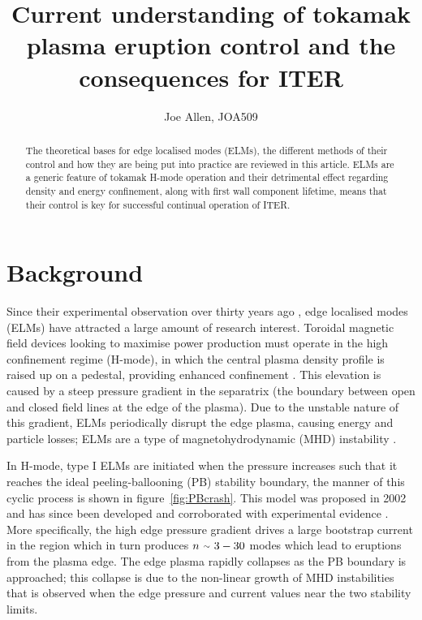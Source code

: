 \documentclass[11pt, twocolumn]{article}  %
\providecommand{\squiggle}{\raise.17ex\hbox{$\scriptstyle\sim$}} %
\begin{document}
\title{Current understanding of tokamak plasma eruption control and the consequences for ITER}
\author{Joe Allen, JOA509}
\maketitle

\begin{abstract}
The theoretical bases for edge localised modes (ELMs), the different methods of their control and how they are being put into practice are reviewed in this article. ELMs are a generic feature of tokamak H-mode operation and their detrimental effect regarding density and energy confinement, along with first wall component lifetime, means that their control is key for successful continual operation of ITER. 
\end{abstract}

\tableofcontents

\section{Background}\label{sec:Bg}
Since their experimental observation over thirty years ago \cite{Keilhacker1984}, edge localised modes (ELMs) have attracted a large amount of research interest. Toroidal magnetic field devices looking to maximise power production must operate in the high confinement regime (H-mode), in which the central plasma density profile is raised up on a pedestal, providing enhanced confinement \cite{Wagner2007}. This elevation is caused by a steep pressure gradient in the separatrix (the boundary between open and closed field lines at the edge of the plasma). Due to the unstable nature of this gradient, ELMs periodically disrupt the edge plasma, causing energy and particle losses; ELMs are a type of magnetohydrodynamic (MHD) instability \cite{Zohm1996}.

In H-mode, type I ELMs are initiated when the pressure increases such that it reaches the ideal peeling-ballooning (PB) stability boundary, the manner of this cyclic process is shown in figure~\ref{fig:PBcrash}. This model was proposed in 2002 \cite{Snyder2002} and has since been developed and corroborated with experimental evidence \cite{Wilson2002}. More specifically, the high edge pressure gradient drives a large bootstrap current in the region which in turn produces $n~\squiggle~3-30$ modes \cite{Snyder2009} which lead to eruptions from the plasma edge. The edge plasma rapidly collapses as the PB boundary is approached; this collapse is due to the non-linear growth of MHD instabilities \cite{Wilson2004} that is observed when the edge pressure and current values near the two stability limits.
\end{document}

